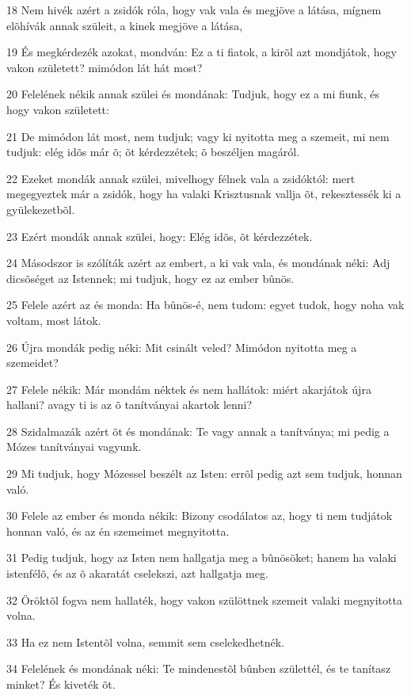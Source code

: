 \par 18 Nem hivék azért a zsidók róla, hogy vak vala és megjöve a látása, mígnem elõhívák annak szüleit, a kinek megjöve a látása,
\par 19 És megkérdezék azokat, mondván: Ez a ti fiatok, a kirõl azt mondjátok, hogy vakon született? mimódon lát hát most?
\par 20 Felelének nékik annak szülei és mondának: Tudjuk, hogy ez a mi fiunk, és hogy vakon született:
\par 21 De mimódon lát most, nem tudjuk; vagy ki nyitotta meg a szemeit, mi nem tudjuk: elég idõs már õ; õt kérdezzétek; õ beszéljen magáról.
\par 22 Ezeket mondák annak szülei, mivelhogy félnek vala a zsidóktól: mert megegyeztek már a zsidók, hogy ha valaki Krisztusnak vallja õt, rekesztessék ki a gyülekezetbõl.
\par 23 Ezért mondák annak szülei, hogy: Elég idõs, õt kérdezzétek.
\par 24 Másodszor is szólíták azért az embert, a ki vak vala, és mondának néki: Adj dicsõséget az Istennek; mi tudjuk, hogy ez az ember bûnös.
\par 25 Felele azért az és monda: Ha bûnös-é, nem tudom: egyet tudok, hogy noha vak voltam, most látok.
\par 26 Újra mondák pedig néki: Mit csinált veled? Mimódon nyitotta meg a szemeidet?
\par 27 Felele nékik: Már mondám néktek és nem hallátok: miért akarjátok újra hallani? avagy ti is az õ tanítványai akartok lenni?
\par 28 Szidalmazák azért õt és mondának: Te vagy annak a tanítványa; mi pedig a Mózes tanítványai vagyunk.
\par 29 Mi tudjuk, hogy Mózessel beszélt az Isten: errõl pedig azt sem tudjuk, honnan való.
\par 30 Felele az ember és monda nékik: Bizony csodálatos az, hogy ti nem tudjátok honnan való, és az én szemeimet megnyitotta.
\par 31 Pedig tudjuk, hogy az Isten nem hallgatja meg a bûnösöket; hanem ha valaki istenfélõ, és az õ akaratát cselekszi, azt hallgatja meg.
\par 32 Öröktõl fogva nem hallaték, hogy vakon szülöttnek szemeit valaki megnyitotta volna.
\par 33 Ha ez nem Istentõl volna, semmit sem cselekedhetnék.
\par 34 Felelének és mondának néki: Te mindenestõl bûnben születtél, és te tanítasz minket? És kiveték õt.
